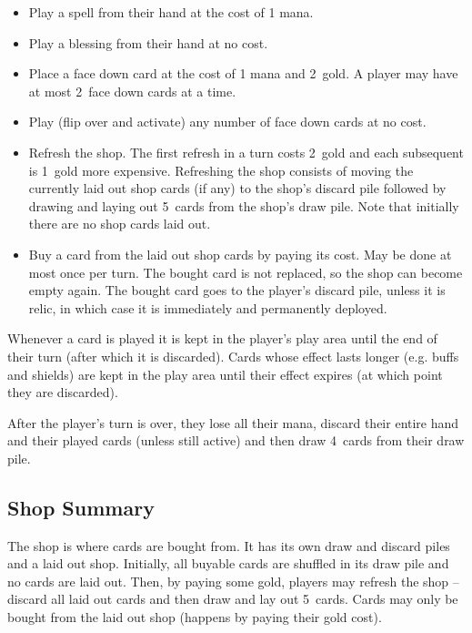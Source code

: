 \documentclass[dvipsnames,parskip,a4paper]{scrartcl}
\newcommand{\facedowncost}{2}
\newcommand{\refreshcost}{2}
\newcommand{\refreshcostincrease}{1}
\newcommand{\handsize}{4}
\newcommand{\dacedownsize}{2}
\newcommand{\shopsize}{5}
\begin{document}
\begin{itemize}
\item Play a spell from their hand at the cost of 1 mana.
\item Play a blessing from their hand at no cost.
\item Place a face down card at the cost of 1 mana and \facedowncost \ gold. A player may have at most \dacedownsize \ face down cards at a time.
\item Play (flip over and activate) any number of face down cards at no cost.
\item Refresh the shop. The first refresh in a turn costs \refreshcost \ gold and each subsequent is \refreshcostincrease \ gold more expensive.
Refreshing the shop consists of moving the currently laid out shop cards (if any) to the shop's discard pile followed by drawing and laying out \shopsize \ cards from the shop's draw pile. Note that initially there are no shop cards laid out.
\item Buy a card from the laid out shop cards by paying its cost. May be done at most once per turn.
The bought card is not replaced, so the shop can become empty again. The bought card goes to the player's discard pile, unless it is relic, in which case it is immediately and permanently deployed.
\end{itemize}

Whenever a card is played it is kept in the player's play area until the end of their turn (after which it is discarded). Cards whose effect lasts longer (e.g. buffs and shields) are kept in the play area until their effect expires (at which point they are discarded).

\vspace{4pt}

After the player's turn is over, they lose all their mana, discard their entire hand and their played cards (unless still active) and then draw \handsize \ cards from their draw pile.

\subsection*{Shop Summary}

The shop is where cards are bought from. It has its own draw and discard piles and a laid out shop. Initially, all buyable cards are shuffled in its draw pile and no cards are laid out. Then, by paying some gold, players may refresh the shop -- discard all laid out cards and then draw and lay out \shopsize \ cards. Cards may only be bought from the laid out shop (happens by paying their gold cost).
\end{document}
